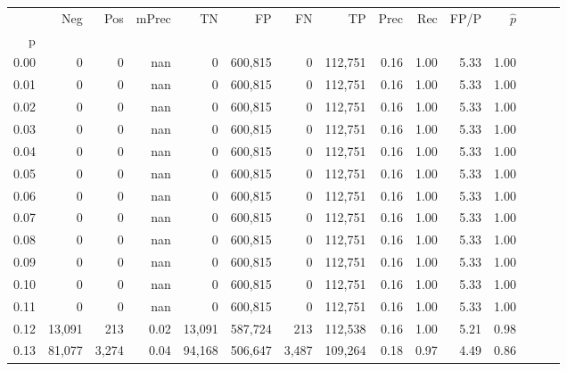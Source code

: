 \begin{tabular}{rrrrrrrrrrrrrrr}
\toprule
{} &      Neg &     Pos & mPrec &       TN &       FP &       FN &       TP &  Prec &   Rec &  FP/P & $\hat{p}$ \\
p    &          &         &       &          &          &          &          &       &       &       &           \\
\midrule
0.00 &        0 &       0 &   nan &        0 &  600,815 &        0 &  112,751 &  0.16 &  1.00 &  5.33 &      1.00 \\
0.01 &        0 &       0 &   nan &        0 &  600,815 &        0 &  112,751 &  0.16 &  1.00 &  5.33 &      1.00 \\
0.02 &        0 &       0 &   nan &        0 &  600,815 &        0 &  112,751 &  0.16 &  1.00 &  5.33 &      1.00 \\
0.03 &        0 &       0 &   nan &        0 &  600,815 &        0 &  112,751 &  0.16 &  1.00 &  5.33 &      1.00 \\
0.04 &        0 &       0 &   nan &        0 &  600,815 &        0 &  112,751 &  0.16 &  1.00 &  5.33 &      1.00 \\
0.05 &        0 &       0 &   nan &        0 &  600,815 &        0 &  112,751 &  0.16 &  1.00 &  5.33 &      1.00 \\
0.06 &        0 &       0 &   nan &        0 &  600,815 &        0 &  112,751 &  0.16 &  1.00 &  5.33 &      1.00 \\
0.07 &        0 &       0 &   nan &        0 &  600,815 &        0 &  112,751 &  0.16 &  1.00 &  5.33 &      1.00 \\
0.08 &        0 &       0 &   nan &        0 &  600,815 &        0 &  112,751 &  0.16 &  1.00 &  5.33 &      1.00 \\
0.09 &        0 &       0 &   nan &        0 &  600,815 &        0 &  112,751 &  0.16 &  1.00 &  5.33 &      1.00 \\
0.10 &        0 &       0 &   nan &        0 &  600,815 &        0 &  112,751 &  0.16 &  1.00 &  5.33 &      1.00 \\
0.11 &        0 &       0 &   nan &        0 &  600,815 &        0 &  112,751 &  0.16 &  1.00 &  5.33 &      1.00 \\
0.12 &   13,091 &     213 &  0.02 &   13,091 &  587,724 &      213 &  112,538 &  0.16 &  1.00 &  5.21 &      0.98 \\
0.13 &   81,077 &   3,274 &  0.04 &   94,168 &  506,647 &    3,487 &  109,264 &  0.18 &  0.97 &  4.49 &      0.86 \\

\end{tabular}
